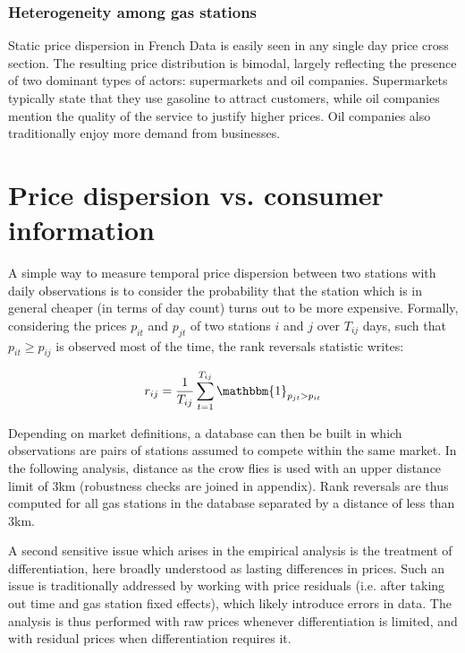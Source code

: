 \documentclass[11pt]{article}
\begin{document}
\subsubsection{Heterogeneity among gas stations}

Static price dispersion in French Data is easily seen in any single day price cross section. The resulting price distribution is bimodal, largely reflecting the presence of two dominant types of actors: supermarkets and oil companies. Supermarkets typically state that they use gasoline to attract customers, while oil companies mention the quality of the service to justify higher prices. Oil companies also traditionally enjoy more demand from businesses.

\section{Price dispersion vs. consumer information}

A simple way to measure temporal price dispersion between two stations with daily observations is to consider the probability that the station which is in general cheaper (in terms of day count) turns out to be more expensive. Formally, considering the prices $p_{it}$ and $p_{jt}$ of two stations $i$ and $j$ over $T_{ij}$ days, such that $p_{it} \ge p_{ij}$ is observed most of the time, the rank reversals statistic writes:

\begin{align*}
r_{ij} = \frac{1}{T_{ij}} \sum_{t=1}^{T_{ij}} \mathbbm{1}_{p_{jt} > p_{it}}
\end{align*}

Depending on market definitions, a database can then be built in which observations are pairs of stations assumed to compete within the same market. In the following analysis, distance as the crow flies is used with an upper distance limit of 3km (robustness checks are joined in appendix). Rank reversals are thus computed for all gas stations in the database separated by a distance of less than 3km.

A second sensitive issue which arises in the empirical analysis is the treatment of differentiation, here broadly understood as lasting differences in prices. Such an issue is traditionally addressed by working with price residuals (i.e. after taking out time and gas station fixed effects), which likely introduce errors in data. The analysis is thus performed with raw prices whenever differentiation is limited, and with residual prices when differentiation requires it.
\end{document}
